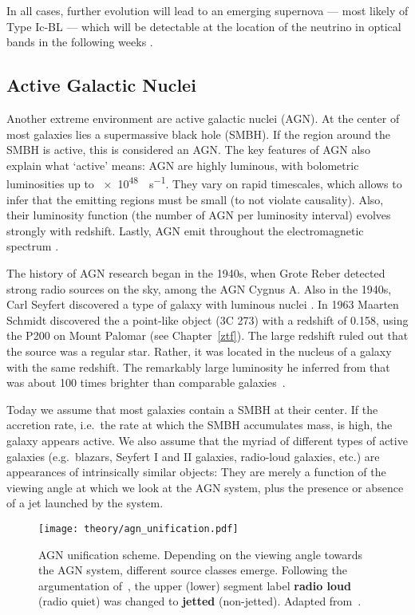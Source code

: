 In all cases, further evolution will lead to an emerging supernova --- most likely of Type Ic-BL --- which will be detectable at the location of the neutrino in optical bands in the following weeks .

\subsection{Active Galactic Nuclei}\label{agn}
Another extreme environment are active galactic nuclei (AGN). At the center of most galaxies lies a supermassive black hole (SMBH). If the region around the SMBH is active, this is considered an AGN\@. The key features of AGN also explain what `active' means: AGN are highly luminous, with bolometric luminosities up to \SI{e48}{\erg\per\s}. They vary on rapid timescales, which allows to infer that the emitting regions must be small (to not violate causality). Also, their luminosity function (the number of AGN per luminosity interval) evolves strongly with redshift. Lastly, AGN emit throughout the electromagnetic spectrum .

The history of AGN research began in the 1940s, when Grote Reber detected strong radio sources on the sky, among the AGN Cygnus A. Also in the 1940s, Carl Seyfert discovered a type of galaxy with luminous nuclei . In 1963 Maarten Schmidt discovered the a point-like object (3C 273) with a redshift of 0.158, using the P200 on Mount Palomar (see Chapter~\ref{ztf}). The large redshift ruled out that the source was a regular star. Rather, it was located in the nucleus of a galaxy with the same redshift. The remarkably large luminosity he inferred from that was about 100 times brighter than comparable galaxies~.

Today we assume that most galaxies contain a SMBH at their center. If the accretion rate, i.e.\ the rate at which the SMBH accumulates mass, is high, the galaxy appears active. We also assume that the myriad of different types of active galaxies (e.g.\ blazars, Seyfert I and II galaxies, radio-loud galaxies, etc.) are appearances of intrinsically similar objects: They are merely a function of the viewing angle at which we look at the AGN system, plus the presence or absence of a jet launched by the system.

\begin{figure}[htb]
    \texttt{[image: theory/agn\_unification.pdf]}
    \caption[AGN]{AGN unification scheme. Depending on the viewing angle towards the AGN system, different source classes emerge. Following the argumentation of~\cite{Padovani2017}, the upper (lower) segment label \textbf{radio loud} (radio quiet) was changed to \textbf{jetted} (non-jetted). Adapted from~\cite{Thorne2022}.}
\end{figure}

